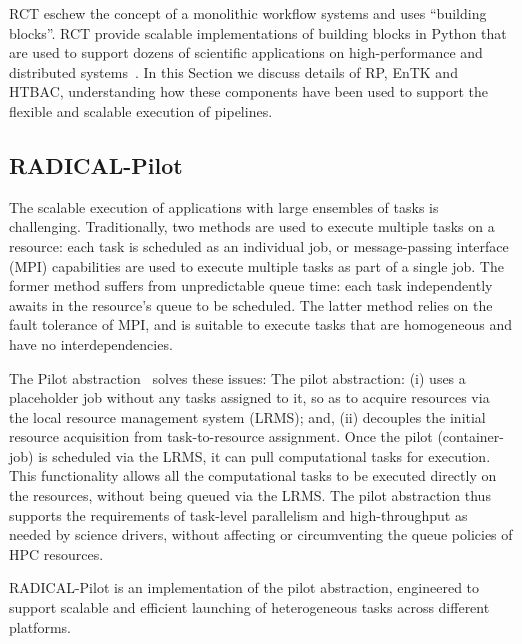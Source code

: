 \documentclass{bmcart}
\begin{document}
RCT eschew the concept of a monolithic workflow systems and uses ``building
blocks''. RCT provide scalable implementations of building blocks in Python
that are used to support dozens of scientific applications on
high-performance and distributed systems~\cite{turilli2016analysis,angius2017converging,treikalis2016repex, balasubramanian2016ensemble,balasubramanian2016extasy}. In this Section we discuss details of RP, EnTK
and HTBAC, understanding how these components have been used to support the
flexible and scalable execution of pipelines.

\subsection*{RADICAL-Pilot}\label{ssec:RP}

The scalable execution of applications with large ensembles of tasks is
challenging. Traditionally, two methods are used to execute multiple tasks on
a resource: each task is scheduled as an individual job, or message-passing
interface (MPI) capabilities
are used to execute multiple tasks as part of a single job. The former method
suffers from unpredictable queue time: each task independently awaits in the
resource's queue to be scheduled. The latter method relies on the fault
tolerance of MPI, and is suitable to execute tasks that are homogeneous and
have no interdependencies.

The Pilot abstraction~\cite{turilli2017comprehensive} solves these issues:
The pilot abstraction: (i) uses a placeholder job without any tasks assigned
to it, so as to acquire resources via the local resource management system
(LRMS); and, (ii) decouples the initial resource acquisition from
task-to-resource assignment. Once the pilot (container-job) is scheduled via
the LRMS, it can pull computational tasks for execution. This functionality
allows all the computational tasks to be executed directly on the resources,
without being queued via the LRMS\@. The pilot abstraction thus supports the
requirements of task-level parallelism and high-throughput as needed by
science drivers, without affecting or circumventing the queue policies of HPC
resources.

RADICAL-Pilot is an implementation of the pilot abstraction, engineered to
support scalable and efficient launching of heterogeneous tasks across
different platforms.

\end{document}
